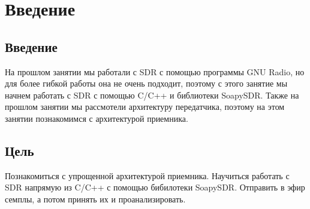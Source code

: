 \chapter{Введение}

\section{Введение}

На прошлом занятии мы работали с SDR с помощью программы GNU Radio, но для более гибкой работы она не очень подходит, поэтому
с этого занятие мы начнем работать с SDR с помощью C/C++ и библиотеки SoapySDR. Также на прошлом занятии мы рассмотели архитектуру
передатчика, поэтому на этом занятии познакомимся с архитектурой приемника.

\section{Цель}

Познакомиться с упрощенной архитектурой приемника. Научиться работать с SDR напрямую из C/C++ с помощью бибилотеки SoapySDR. 
Отправить в эфир семплы, а потом принять их и проанализировать.

\endinput